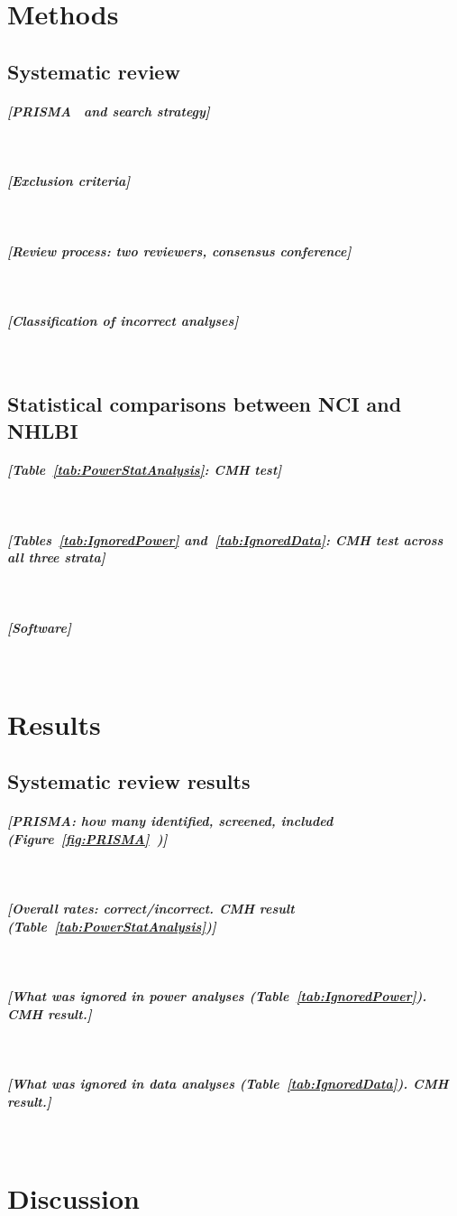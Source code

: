 \documentclass{article}
\newcommand{\outline}[1]{\paragraph{\textit{[#1]}}\mbox{}\\}
\begin{document}
\section{Methods}

\subsection{Systematic review}

\outline{PRISMA~\cite{page_prisma_2021} and search strategy}

\outline{Exclusion criteria}

\outline{Review process: two reviewers, consensus conference}

\outline{Classification of incorrect analyses}

\subsection{Statistical comparisons between NCI and NHLBI}

\outline{Table~\ref{tab:PowerStatAnalysis}: CMH test}

\outline{Tables~\ref{tab:IgnoredPower} and~\ref{tab:IgnoredData}: CMH test across all three strata}

\outline{Software}

\section{Results}

\subsection{Systematic review results}

\outline{PRISMA: how many identified, screened, included (Figure~\ref{fig:PRISMA}~\cite{page_prisma_2021})}

\outline{Overall rates: correct/incorrect. CMH result (Table~\ref{tab:PowerStatAnalysis})}

\outline{What was ignored in power analyses (Table~\ref{tab:IgnoredPower}). CMH result.}

\outline{What was ignored in data analyses (Table~\ref{tab:IgnoredData}). CMH result.}

\section{Discussion}
\end{document}
